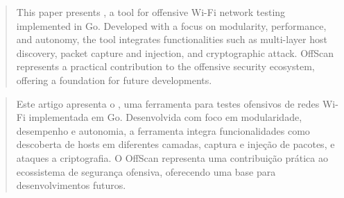 \begin{abstract}
This paper presents \offscan, a tool for offensive Wi-Fi network testing implemented in Go. Developed with a focus on modularity, performance, and autonomy, the tool integrates functionalities such as multi-layer host discovery, packet capture and injection, and cryptographic attack. OffScan represents a practical contribution to the offensive security ecosystem, offering a foundation for future developments.
\end{abstract}



\begin{abstract}
Este artigo apresenta o \offscan, uma ferramenta para testes ofensivos de redes Wi-Fi implementada em Go. Desenvolvida com foco em modularidade, desempenho e autonomia, a ferramenta integra funcionalidades como descoberta de hosts em diferentes camadas, captura e injeção de pacotes, e ataques a criptografia. O OffScan representa uma contribuição prática ao ecossistema de segurança ofensiva, oferecendo uma base para desenvolvimentos futuros.
\end{abstract}